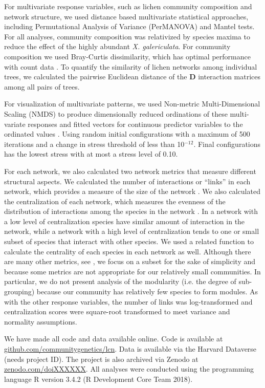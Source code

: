 \documentclass[9pt,twocolumn,twoside,lineno]{pnas-new}
\begin{document}
{For multivariate response variables, such as lichen community
composition and network structure, we used distance based multivariate
statistical approaches, including Permutational Analysis of Variance
(PerMANOVA) and Mantel tests. For all analyses, community composition
was relativized by species maxima to reduce the effect of the highly
abundant \textit{X. galericulata}. For community composition we used
Bray-Curtis dissimilarity, which has optimal performance with count
data \citep{Minchen1998}. To quantify the similarity of lichen
networks among individual trees, we calculated the pairwise Euclidean
distance of the $\mathbf{D}$ interaction matrices among all pairs of
trees.

For visualization of multivariate patterns, we used Non-metric
Multi-Dimensional Scaling (NMDS) \cite{ecodist} to produce
dimensionally reduced ordinations of these multi-variate responses and
fitted vectors for continuous predictor variables to the ordinated
values \cite{vegan}. Using random initial configurations with a
maximum of 500 iterations and a change in stress threshold of less
than 10$^{-12}$. Final configurations has the lowest stress with at
most a stress level of 0.10.


For each network, we also calculated two network metrics that measure
different structural aspects. We calculated the number of interactions
or ``links'' in each network, which provides a measure of the size of
the network \citep{Lau2015, Borrett2015}. We also calculated the
centralization of each network, which measures the evenness of the
distribution of interactions among the species in the network
\cite{Butts2005}. In a network with a low level of centralization
species have similar amount of interaction in the network, while a
network with a high level of centralization tends to one or small
subset of species that interact with other species. We used a related
function to calculate the centrality of each species in each network
as well. Although there are many other metrics, see \citep{Lau2017a},
we focus on a subset for the sake of simplicity and because some
metrics are not appropriate for our relatively small communities. In
particular, we do not present analysis of the modularity (i.e. the
degree of sub-grouping) because our community has relatively few
species to form modules. As with the other response variables, the
number of links was log-transformed and centralization scores were
square-root transformed to meet variance and normality assumptions.

We have made all code and data available online. Code is available at
\url{github.com/communitygenetics/lcn}. Data is available via the
Harvard Dataverse (needs project ID). The project is also archived via
Zenodo at \url{zenodo.com/doiXXXXXX}. All analyses were conducted
using the programming language R version 3.4.2 (R Development Core
Team 2018).

}
\end{document}
